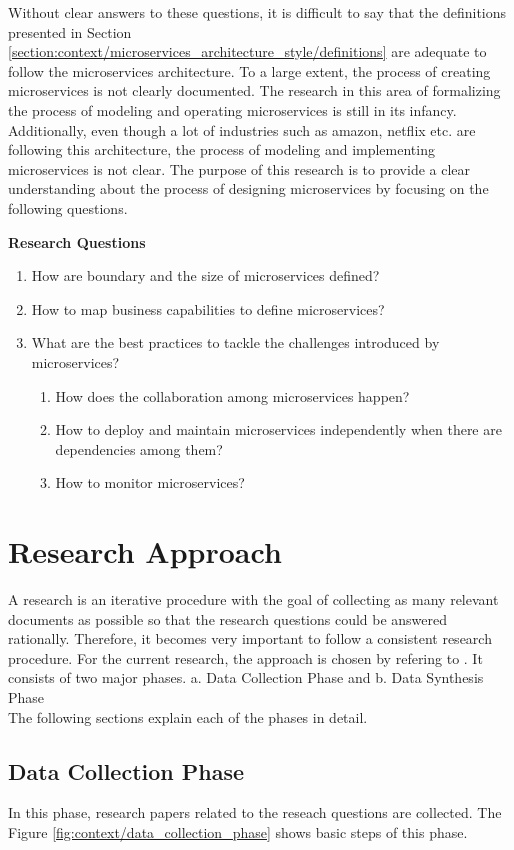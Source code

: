 Without clear answers to these questions, it is difficult to say that the definitions presented in Section \ref{section:context/microservices_architecture_style/definitions} are adequate to follow the microservices architecture. To a large extent, the process of creating microservices is not clearly documented. The research in this area of formalizing the process of modeling and operating microservices is still in its infancy. Additionally, even though a lot of industries such as amazon, netflix etc. are following this architecture, the process of modeling and implementing microservices is not clear. The purpose of this research is to provide a clear understanding about the process of designing microservices by focusing on the following questions.
\begin{shaded}
\textbf{Research Questions}\label{list:introduction/research_questions}
\end{shaded}
\begin{enumerate}
\item How are boundary and the size of microservices defined?
\item How to map business capabilities to define microservices?
\item What are the best practices to tackle the challenges introduced by microservices?
    \begin{enumerate}
    \item How does the collaboration among microservices happen?
    \item How to deploy and maintain microservices independently when there are dependencies among them?
    \item How to monitor microservices?
    \end{enumerate}
\end{enumerate}
\section{Research Approach}\label{section:context/approach}
A research is an iterative procedure with the goal of collecting as many relevant documents as possible so that the research questions could be answered rationally. Therefore, it becomes very important to follow a consistent research procedure. For the current research, the approach is chosen by refering to \cite{np:2007aa}. It consists of two major phases.
a. {Data Collection Phase} and 
b. {Data Synthesis Phase}
\\
The following sections explain each of the phases in detail.
\subsection{Data Collection Phase}\label{section:context/approach/data_collection_phase}
In this phase, research papers related to the reseach questions are collected. The Figure \ref{fig:context/data_collection_phase} shows basic steps of this phase.


